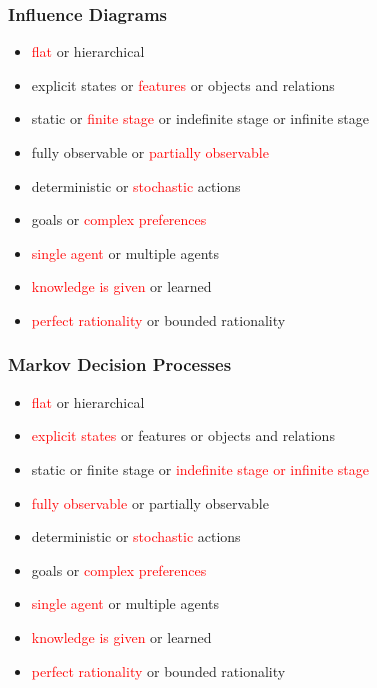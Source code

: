 \documentclass[UTF8,11pt,colorlinks,compress,openany]{beamer}%
\begin{document}
\begin{frame}\frametitle{Influence Diagrams}
\begin{itemize}
	\item \textcolor{red}{flat} or hierarchical
	\item explicit states or \textcolor{red}{features} or objects and relations
	\item static or \textcolor{red}{finite stage} or indefinite stage or infinite stage
	\item fully observable or \textcolor{red}{partially observable}
	\item deterministic or \textcolor{red}{stochastic} actions
	\item goals or \textcolor{red}{complex preferences}
	\item \textcolor{red}{single agent} or multiple agents
	\item \textcolor{red}{knowledge is given} or learned
	\item \textcolor{red}{perfect rationality} or bounded rationality
\end{itemize}
\end{frame}

\begin{frame}\frametitle{Markov Decision Processes}
\begin{itemize}
	\item \textcolor{red}{flat} or hierarchical
	\item \textcolor{red}{explicit states} or features or objects and relations
	\item static or finite stage or \textcolor{red}{indefinite stage or infinite stage}
	\item \textcolor{red}{fully observable} or partially observable
	\item deterministic or \textcolor{red}{stochastic} actions
	\item goals or \textcolor{red}{complex preferences}
	\item \textcolor{red}{single agent} or multiple agents
	\item \textcolor{red}{knowledge is given} or learned
	\item \textcolor{red}{perfect rationality} or bounded rationality
\end{itemize}
\end{frame}
\end{document}
